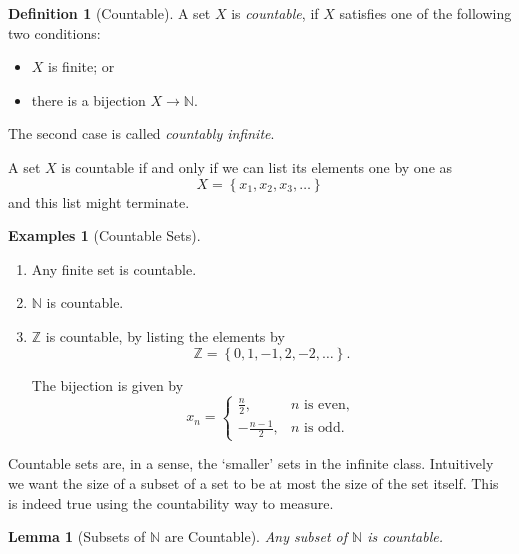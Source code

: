 \documentclass{article}
\newtheorem{lemma}[theorem]{Lemma}
\theoremstyle{definition}
\newtheorem{definition}[theorem]{Definition}
\newtheorem{examples}[theorem]{Examples}
\theoremstyle{remark}
\newcommand{\Bqty}[1]{\left\{#1\right\}}
\newcommand{\NN}{\mathbb{N}}
\newcommand{\ZZ}{\mathbb{Z}}
\begin{document}
\begin{definition}[Countable]
    A set \(X\) is \emph{countable}, if \(X\) satisfies one of the following two conditions:
    \begin{itemize}
        \item \(X\) is finite; or
        \item there is a bijection \(X \to \NN\).
    \end{itemize}

    The second case is called \emph{countably infinite}.
\end{definition}

A set \(X\) is countable if and only if we can list its elements one by one as
\[
    X = \Bqty{x_1, x_2, x_3, \ldots}
\]
and this list might terminate.

\begin{examples}[Countable Sets]
    \begin{enumerate}
        \item Any finite set is countable.
        \item \(\NN\) is countable.
        \item \(\ZZ\) is countable, by listing the elements by
        \[
        \ZZ = \Bqty{0, 1, -1, 2, -2, \ldots}.
        \]

        The bijection is given by
        \[
            x_n = \begin{cases}
                \frac{n}{2}, & n \text{ is even}, \\
                - \frac{n - 1}{2}, & n \text{ is odd}.
            \end{cases}
        \]
    \end{enumerate}
\end{examples}

Countable sets are, in a sense, the `smaller' sets in the infinite class. Intuitively we want the size of a subset of a set to be at most the size of the set itself. This is indeed true using the countability way to measure.

\begin{lemma}[Subsets of \(\NN\) are Countable]
    Any subset of \(\NN\) is countable.
\end{lemma}
\end{document}
